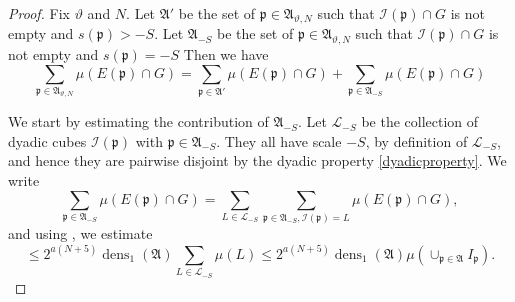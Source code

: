 \documentclass[10pt,a4paper]{article}
\theoremstyle{plain}
\theoremstyle{definition}
\numberwithin{equation}{subsection}
\DeclareMathOperator{\dens}{\operatorname{dens}}
\newcommand{\fp}{{\mathfrak p}}
\newcommand{\scI}{{\mathcal{I}}} %
\newcommand{\mfa}{{\vartheta}}
\newcommand{\leanok}{}
\begin{document}
\begin{proof}
\leanok
{Fix $\mfa$ and $N$. Let
$\mathfrak{A}'$ be the set of $\fp\in\mathfrak{A}_{\mfa,N}$ such that $\scI(\fp)\cap G$ is not empty and $s(\fp) > -S$.
Let $\mathfrak{A}_{-S}$ be the set of $\fp\in\mathfrak{A}_{\mfa,N}$ such that $\scI(\fp)\cap G$ is not empty and $s(\fp) = -S$ }
Then we have
\begin{equation*}
    \sum_{\fp\in\mathfrak{A}_{\mfa,N}}\mu(E(\fp)\cap G) =
    \sum_{\fp\in\mathfrak{A}'}\mu(E(\fp)\cap G) + \sum_{\fp\in\mathfrak{A}_{-S}}\mu(E(\fp)\cap G)
\end{equation*}

We start by estimating the contribution of $\mathfrak{A}_{-S}$. Let $\mathcal{L}_{-S}$ be the
collection of dyadic cubes $\scI(\fp)$ with $\fp \in \mathfrak{A}_{-S}$. They all have scale $-S$,
by definition of $\mathcal{L}_{-S}$, and hence they are pairwise disjoint by the dyadic property
\eqref{dyadicproperty}. We write
\[
    \sum_{\fp\in\mathfrak{A}_{-S}}\mu(E(\fp)\cap G)
    = \sum_{L \in \mathcal{L}_{-S}} \sum_{\fp\in\mathfrak{A}_{-S}, \scI(\fp) = L} \mu(E(\fp)\cap G),
\]
and using , we estimate
\begin{equation}\label{eq_minus_S}
    \le 2^{a(N+5)} \dens_1(\mathfrak{A}) \sum_{L \in \mathcal{L}_{-S}} \mu(L)
    \le 2^{a(N+5)} \dens_1(\mathfrak{A}) \mu\left(\cup_{\fp\in\mathfrak{A}}I_{\fp}\right).
\end{equation}


\end{proof}
\end{document}
